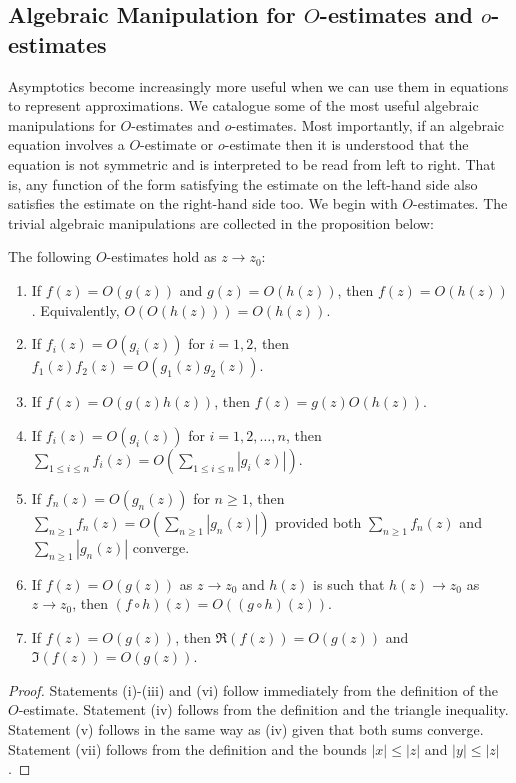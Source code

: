       \subsection*{Algebraic Manipulation for \texorpdfstring{$O$}{O}-estimates and \texorpdfstring{$o$}{o}-estimates}
        Asymptotics become increasingly more useful when we can use them in equations to represent approximations. We catalogue some of the most useful algebraic manipulations for $O$-estimates and $o$-estimates. Most importantly, if an algebraic equation involves a $O$-estimate or $o$-estimate then it is understood that the equation is not symmetric and is interpreted to be read from left to right. That is, any function of the form satisfying the estimate on the left-hand side also satisfies the estimate on the right-hand side too. We begin with $O$-estimates. The trivial algebraic manipulations are collected in the proposition below:

        \begin{proposition}\label{prop:Big_Oh_manipulations}
            The following $O$-estimates hold as $z \to z_{0}$:
            \begin{enumerate}[label=(\roman*)]
              \item If $f(z) = O(g(z))$ and $g(z) = O(h(z))$, then $f(z) = O(h(z))$. Equivalently, $O(O(h(z))) = O(h(z))$.
              \item If $f_{i}(z) = O(g_{i}(z))$ for $i = 1,2$, then $f_{1}(z)f_{2}(z) = O(g_{1}(z)g_{2}(z))$.
              \item If $f(z) = O(g(z)h(z))$, then $f(z) = g(z)O(h(z))$.
              \item If $f_{i}(z) = O(g_{i}(z))$ for $i = 1,2,\ldots,n$, then $\sum_{1 \le i \le n}f_{i}(z) = O\left(\sum_{1 \le i \le n}|g_{i}(z)|\right)$.
              \item If $f_{n}(z) = O(g_{n}(z))$ for $n \ge 1$, then $\sum_{n \ge 1}f_{n}(z) = O\left(\sum_{n \ge 1}|g_{n}(z)|\right)$ provided both $\sum_{n \ge 1}f_{n}(z)$ and $\sum_{n \ge 1}|g_{n}(z)|$ converge.
              \item If $f(z) = O(g(z))$ as $z \to z_{0}$ and $h(z)$ is such that $h(z) \to z_{0}$ as $z \to z_{0}$, then $(f \circ h)(z) = O((g \circ h)(z))$.
              \item If $f(z) = O(g(z))$, then $\Re(f(z)) = O(g(z))$ and $\Im(f(z)) = O(g(z))$.
            \end{enumerate}
        \end{proposition}
        \begin{proof}
          Statements (i)-(iii) and (vi) follow immediately from the definition of the $O$-estimate. Statement (iv) follows from the definition and the triangle inequality. Statement (v) follows in the same way as (iv) given that both sums converge. Statement (vii) follows from the definition and the bounds $|x| \le |z|$ and $|y| \le |z|$.
        \end{proof}

